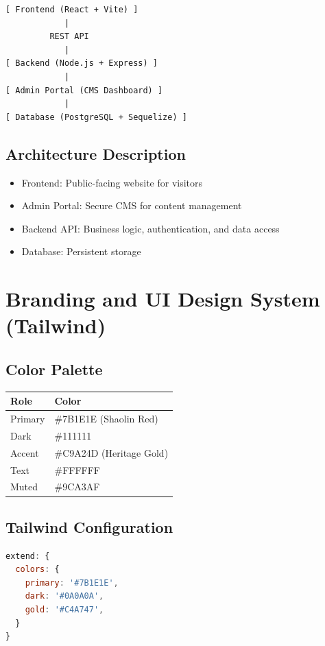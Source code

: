 \documentclass[12pt,a4paper]{article}
\begin{document}
\begin{verbatim}
[ Frontend (React + Vite) ]
            |
         REST API
            |
[ Backend (Node.js + Express) ]
            |
[ Admin Portal (CMS Dashboard) ]
            |
[ Database (PostgreSQL + Sequelize) ]
\end{verbatim}

\subsection*{Architecture Description}
\begin{itemize}
    \item Frontend: Public-facing website for visitors
    \item Admin Portal: Secure CMS for content management
    \item Backend API: Business logic, authentication, and data access
    \item Database: Persistent storage
\end{itemize}

\section{Branding and UI Design System (Tailwind)}

\subsection{Color Palette}

\begin{center}
\begin{tabular}{ll}
\toprule
Role & Color \\
\midrule
Primary & \#7B1E1E (Shaolin Red) \\
Dark & \#111111 \\
Accent & \#C9A24D (Heritage Gold) \\
Text & \#FFFFFF \\
Muted & \#9CA3AF \\
\bottomrule
\end{tabular}
\end{center}

\subsection{Tailwind Configuration}
\begin{lstlisting}[language=JavaScript]
extend: {
  colors: {
    primary: '#7B1E1E',
    dark: '#0A0A0A',
    gold: '#C4A747',
  }
}
\end{lstlisting}
\end{document}

